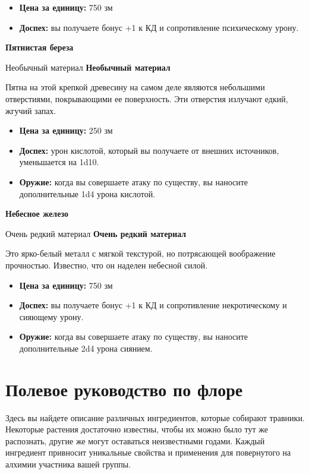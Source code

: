 \documentclass[a4paper, 9pt, twocolumn]{book}
\newcommand{\partc}[2][]{{
		\bigskip
		\noindent
		\hspace{-0.25cm}
		\fontsize{11pt}{13.2}
		\color{sectioncolor}
		\textbf{#2}}
	
	{
		\ifx\relax#1\relax
		\else
		\noindent
		\normalcolor
		\textbf{#1}}
	\bigskip
	\fi
}
\begin{document}
	\begin{itemize}
		\item \textbf{Цена за единицу:} 750 зм
		
		\item \textbf{Доспех:} вы получаете бонус +1 к КД и сопротивление психическому урону.
	\end{itemize}

	\partc[Необычный материал]{Пятнистая береза}
	
	\noindent Пятна на этой крепкой древесину на самом деле являются небольшими отверстиями, покрывающими ее поверхность. Эти отверстия излучают едкий, жгучий запах.
	
	\begin{itemize}
		\item \textbf{Цена за единицу:} 250 зм
		
		\item \textbf{Доспех:} урон кислотой, который вы получаете от внешних источников, уменьшается на 1d10.
		
		\item \textbf{Оружие:} когда вы совершаете атаку по существу, вы наносите дополнительные 1d4 урона кислотой.
	\end{itemize}

	\partc[Очень редкий материал]{Небесное железо}
	
	\noindent Это ярко-белый металл с мягкой текстурой, но потрясающей воображение прочностью. Известно, что он наделен небесной силой.
	
	\begin{itemize}
		\item \textbf{Цена за единицу:} 750 зм
		
		\item \textbf{Доспех:} вы получаете бонус +1 к КД и сопротивление некротическому и сияющему урону. %
		
		\item \textbf{Оружие:} когда вы совершаете атаку по существу, вы наносите дополнительные 2d4 урона сиянием.
	\end{itemize}

	\chapter{Полевое руководство по флоре}
	
	Здесь вы найдете описание различных ингредиентов, которые собирают травники. Некоторые растения достаточно известны, чтобы их можно было тут же распознать, другие же могут оставаться неизвестными годами. Каждый ингредиент привносит уникальные свойства и применения для повернутого на алхимии участника вашей группы.
	
\end{document}
